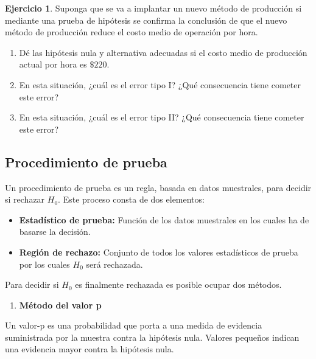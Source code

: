 \documentclass[
]{book}
\providecommand{\tightlist}{%
  \setlength{\itemsep}{0pt}\setlength{\parskip}{0pt}}
\theoremstyle{definition}
\theoremstyle{definition}
\theoremstyle{definition}
\newtheorem{exercise}{Ejercicio}[chapter]
\theoremstyle{definition}
\theoremstyle{remark}
\begin{document}
\begin{exercise}

Suponga que se va a implantar un nuevo método de producción si mediante una prueba de hipótesis se confirma la conclusión de que el nuevo método de producción reduce el costo medio de operación por hora.

\begin{enumerate}
\def\labelenumi{\alph{enumi}.}
\tightlist
\item
  Dé las hipótesis nula y alternativa adecuadas si el costo medio de producción actual por hora es \(\$220\).
\item
  En esta situación, ¿cuál es el error tipo I? ¿Qué consecuencia tiene cometer este error?
\item
  En esta situación, ¿cuál es el error tipo II? ¿Qué consecuencia tiene cometer este error?
\end{enumerate}

\end{exercise}

\hypertarget{procedimiento-de-prueba}{%
\subsection{Procedimiento de prueba}\label{procedimiento-de-prueba}}

Un procedimiento de prueba es un regla, basada en datos muestrales, para decidir si rechazar \(H_0\). Este proceso consta de dos elementos:

\begin{itemize}
\tightlist
\item
  \textbf{Estadístico de prueba:} Función de los datos muestrales en los cuales ha de basarse la decisión.
\item
  \textbf{Región de rechazo:} Conjunto de todos los valores estadísticos de prueba por los cuales \(H_0\) será rechazada.
\end{itemize}

Para decidir si \(H_0\) es finalmente rechazada es posible ocupar dos métodos.

\begin{enumerate}
\def\labelenumi{\arabic{enumi}.}
\tightlist
\item
  \textbf{Método del valor p}
\end{enumerate}

Un valor-p es una probabilidad que porta a una medida de evidencia suministrada por la muestra contra la hipótesis nula. Valores pequeños indican una evidencia mayor contra la hipótesis nula.
\end{document}

